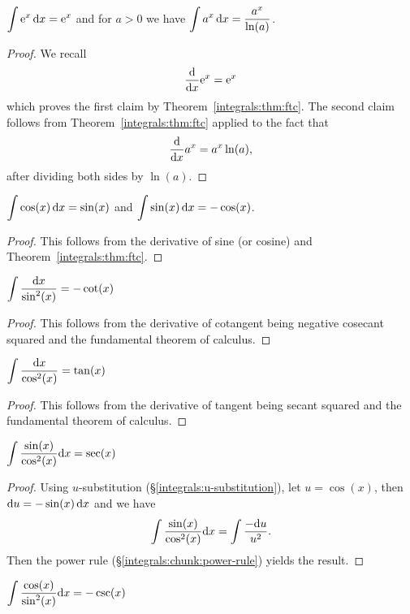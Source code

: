  $\displaystyle{\int \mathrm{e}^{x}\,\mathrm{d}x = \mathrm{e}^{x}}$
and for $a>0$ we have $\displaystyle{\int a^{x}\,\mathrm{d}x = \frac{a^{x}}{\ln(a)}}$.

\begin{proof}
  We recall
  \begin{equation}
\frac{\mathrm{d}}{\mathrm{d} x}\mathrm{e}^{x} = \mathrm{e}^{x}
  \end{equation}
  which proves the first claim by Theorem~\ref{integrals:thm:ftc}. The
  second claim follows from Theorem~\ref{integrals:thm:ftc} applied to
  the fact that
  \begin{equation}
\frac{\mathrm{d}}{\mathrm{d} x}a^{x} = a^{x}\ln(a),
  \end{equation}
  after dividing both sides by $\ln(a)$.
\end{proof}

 $\displaystyle{\int \cos(x)\,\mathrm{d}x = \sin(x)}$
and $\displaystyle{\int \sin(x)\,\mathrm{d}x = -\cos(x)}$.

\begin{proof}
This follows from the derivative of sine (or cosine) and Theorem~\ref{integrals:thm:ftc}.
\end{proof}

\M $\displaystyle{\int \frac{\mathrm{d}x}{\sin^{2}(x)} = -\cot(x)}$

\begin{proof}
This follows from the derivative of cotangent being negative cosecant
squared and the fundamental theorem of calculus.
\end{proof}

\M $\displaystyle{\int \frac{\mathrm{d}x}{\cos^{2}(x)} = \tan(x)}$

\begin{proof}
This follows from the derivative of tangent being secant squared and the fundamental theorem
of calculus.
\end{proof}

\M $\displaystyle{\int \frac{\sin(x)}{\cos^{2}(x)}\mathrm{d}x = \sec(x)}$

\begin{proof}
Using $u$-substitution (\S\ref{integrals:u-substitution}),
let $u=\cos(x)$, then $\mathrm{d} u=-\sin(x)\,\mathrm{d} x$ and we have
\begin{equation}
\int \frac{\sin(x)}{\cos^{2}(x)}\mathrm{d} x=\int\frac{-\mathrm{d} u}{u^{2}}.
\end{equation}
Then the power rule (\S\ref{integrals:chunk:power-rule}) yields the result.
\end{proof}

\M $\displaystyle{\int \frac{\cos(x)}{\sin^{2}(x)}\mathrm{d}x = -\csc(x)}$

